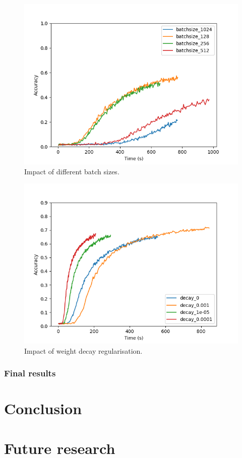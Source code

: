 \documentclass{article}
\begin{document}
\begin{figure}
    \centering
    \includegraphics[width=\linewidth]{../Graphs/batchsize.png}
    \caption{Impact of different batch sizes.}
    \label{fig:batchsize}
\end{figure}
\begin{figure}
    \centering
    \includegraphics[width=\linewidth]{../Graphs/decay.png}
    \caption{Impact of weight decay regularisation.}
    \label{fig:decay}
\end{figure}
\subsubsection{Final results}
\section{Conclusion}

\section{Future research}



\end{document}
